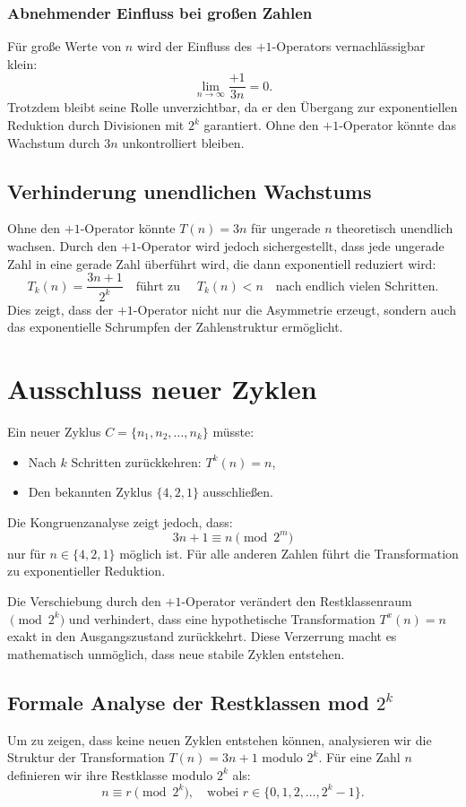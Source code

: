 \documentclass[a4paper,12pt]{article}
\begin{document}
\subsubsection{Abnehmender Einfluss bei großen Zahlen}
Für große Werte von \( n \) wird der Einfluss des \(+1\)-Operators vernachlässigbar klein:
\[
\lim_{n \to \infty} \frac{+1}{3n} = 0.
\]
Trotzdem bleibt seine Rolle unverzichtbar, da er den Übergang zur exponentiellen Reduktion durch Divisionen mit \( 2^k \) garantiert. Ohne den \(+1\)-Operator könnte das Wachstum durch \( 3n \) unkontrolliert bleiben.

\subsection{Verhinderung unendlichen Wachstums}
Ohne den \(+1\)-Operator könnte \( T(n) = 3n \) für ungerade \( n \) theoretisch unendlich wachsen. Durch den \(+1\)-Operator wird jedoch sichergestellt, dass jede ungerade Zahl in eine gerade Zahl überführt wird, die dann exponentiell reduziert wird:
\[
T_k(n) = \frac{3n + 1}{2^k} \quad \text{führt zu } \quad T_k(n) < n \quad \text{nach endlich vielen Schritten}.
\]
Dies zeigt, dass der \(+1\)-Operator nicht nur die Asymmetrie erzeugt, sondern auch das exponentielle Schrumpfen der Zahlenstruktur ermöglicht.

\section{Ausschluss neuer Zyklen}
Ein neuer Zyklus \( C = \{n_1, n_2, \dots, n_k\} \) müsste:
\begin{itemize}
    \item Nach \( k \) Schritten zurückkehren: \( T^k(n) = n \),
    \item Den bekannten Zyklus \( \{4, 2, 1\} \) ausschließen.
\end{itemize}

Die Kongruenzanalyse zeigt jedoch, dass:
\[
3n + 1 \equiv n \pmod{2^m}
\]
nur für \( n \in \{4, 2, 1\} \) möglich ist. Für alle anderen Zahlen führt die Transformation zu exponentieller Reduktion.

Die Verschiebung durch den \(+1\)-Operator verändert den Restklassenraum \(\pmod{2^k}\) und verhindert, dass eine hypothetische Transformation \( T^x(n) = n \) exakt in den Ausgangszustand zurückkehrt. Diese Verzerrung macht es mathematisch unmöglich, dass neue stabile Zyklen entstehen.

\subsection{Formale Analyse der Restklassen mod \( 2^k \)}
Um zu zeigen, dass keine neuen Zyklen entstehen können, analysieren wir die Struktur der Transformation \( T(n) = 3n + 1 \) modulo \( 2^k \). Für eine Zahl \( n \) definieren wir ihre Restklasse modulo \( 2^k \) als:
\[
n \equiv r \pmod{2^k}, \quad \text{wobei } r \in \{0, 1, 2, \dots, 2^k - 1\}.
\]
\end{document}

